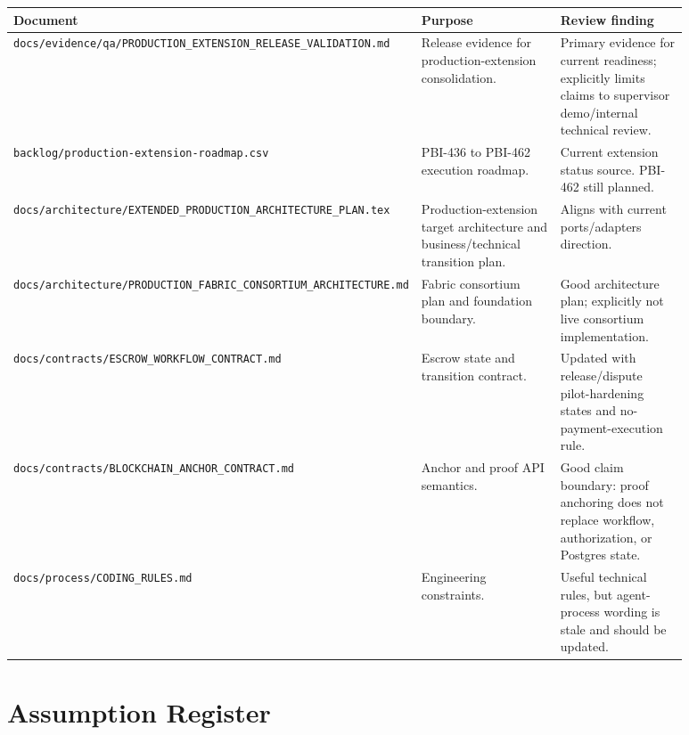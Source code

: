 \documentclass[11pt,a4paper]{article}
\newcommand{\repo}[1]{\texttt{#1}}
\begin{document}
\begin{longtable}{P{0.30\linewidth}P{0.30\linewidth}P{0.28\linewidth}}
\toprule
Document & Purpose & Review finding \\
\midrule
\repo{docs/evidence/qa/PRODUCTION_EXTENSION_RELEASE_VALIDATION.md} & Release evidence for production-extension consolidation. & Primary evidence for current readiness; explicitly limits claims to supervisor demo/internal technical review. \\
\repo{backlog/production-extension-roadmap.csv} & PBI-436 to PBI-462 execution roadmap. & Current extension status source. PBI-462 still planned. \\
\repo{docs/architecture/EXTENDED_PRODUCTION_ARCHITECTURE_PLAN.tex} & Production-extension target architecture and business/technical transition plan. & Aligns with current ports/adapters direction. \\
\repo{docs/architecture/PRODUCTION_FABRIC_CONSORTIUM_ARCHITECTURE.md} & Fabric consortium plan and foundation boundary. & Good architecture plan; explicitly not live consortium implementation. \\
\repo{docs/contracts/ESCROW_WORKFLOW_CONTRACT.md} & Escrow state and transition contract. & Updated with release/dispute pilot-hardening states and no-payment-execution rule. \\
\repo{docs/contracts/BLOCKCHAIN_ANCHOR_CONTRACT.md} & Anchor and proof API semantics. & Good claim boundary: proof anchoring does not replace workflow, authorization, or Postgres state. \\
\repo{docs/process/CODING_RULES.md} & Engineering constraints. & Useful technical rules, but agent-process wording is stale and should be updated. \\
\bottomrule
\end{longtable}

\section{Assumption Register}
\end{document}
